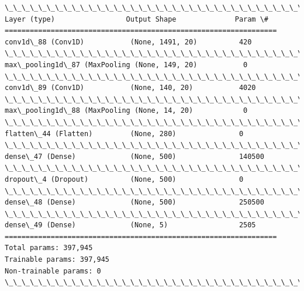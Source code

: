 \documentclass[11pt]{article}
\begin{document}
    \begin{Verbatim}[commandchars=\\\{\}]
\_\_\_\_\_\_\_\_\_\_\_\_\_\_\_\_\_\_\_\_\_\_\_\_\_\_\_\_\_\_\_\_\_\_\_\_\_\_\_\_\_\_\_\_\_\_\_\_\_\_\_\_\_\_\_\_\_\_\_\_\_\_\_\_\_
Layer (type)                 Output Shape              Param \#   
=================================================================
conv1d\_88 (Conv1D)           (None, 1491, 20)          420       
\_\_\_\_\_\_\_\_\_\_\_\_\_\_\_\_\_\_\_\_\_\_\_\_\_\_\_\_\_\_\_\_\_\_\_\_\_\_\_\_\_\_\_\_\_\_\_\_\_\_\_\_\_\_\_\_\_\_\_\_\_\_\_\_\_
max\_pooling1d\_87 (MaxPooling (None, 149, 20)           0         
\_\_\_\_\_\_\_\_\_\_\_\_\_\_\_\_\_\_\_\_\_\_\_\_\_\_\_\_\_\_\_\_\_\_\_\_\_\_\_\_\_\_\_\_\_\_\_\_\_\_\_\_\_\_\_\_\_\_\_\_\_\_\_\_\_
conv1d\_89 (Conv1D)           (None, 140, 20)           4020      
\_\_\_\_\_\_\_\_\_\_\_\_\_\_\_\_\_\_\_\_\_\_\_\_\_\_\_\_\_\_\_\_\_\_\_\_\_\_\_\_\_\_\_\_\_\_\_\_\_\_\_\_\_\_\_\_\_\_\_\_\_\_\_\_\_
max\_pooling1d\_88 (MaxPooling (None, 14, 20)            0         
\_\_\_\_\_\_\_\_\_\_\_\_\_\_\_\_\_\_\_\_\_\_\_\_\_\_\_\_\_\_\_\_\_\_\_\_\_\_\_\_\_\_\_\_\_\_\_\_\_\_\_\_\_\_\_\_\_\_\_\_\_\_\_\_\_
flatten\_44 (Flatten)         (None, 280)               0         
\_\_\_\_\_\_\_\_\_\_\_\_\_\_\_\_\_\_\_\_\_\_\_\_\_\_\_\_\_\_\_\_\_\_\_\_\_\_\_\_\_\_\_\_\_\_\_\_\_\_\_\_\_\_\_\_\_\_\_\_\_\_\_\_\_
dense\_47 (Dense)             (None, 500)               140500    
\_\_\_\_\_\_\_\_\_\_\_\_\_\_\_\_\_\_\_\_\_\_\_\_\_\_\_\_\_\_\_\_\_\_\_\_\_\_\_\_\_\_\_\_\_\_\_\_\_\_\_\_\_\_\_\_\_\_\_\_\_\_\_\_\_
dropout\_4 (Dropout)          (None, 500)               0         
\_\_\_\_\_\_\_\_\_\_\_\_\_\_\_\_\_\_\_\_\_\_\_\_\_\_\_\_\_\_\_\_\_\_\_\_\_\_\_\_\_\_\_\_\_\_\_\_\_\_\_\_\_\_\_\_\_\_\_\_\_\_\_\_\_
dense\_48 (Dense)             (None, 500)               250500    
\_\_\_\_\_\_\_\_\_\_\_\_\_\_\_\_\_\_\_\_\_\_\_\_\_\_\_\_\_\_\_\_\_\_\_\_\_\_\_\_\_\_\_\_\_\_\_\_\_\_\_\_\_\_\_\_\_\_\_\_\_\_\_\_\_
dense\_49 (Dense)             (None, 5)                 2505      
=================================================================
Total params: 397,945
Trainable params: 397,945
Non-trainable params: 0
\_\_\_\_\_\_\_\_\_\_\_\_\_\_\_\_\_\_\_\_\_\_\_\_\_\_\_\_\_\_\_\_\_\_\_\_\_\_\_\_\_\_\_\_\_\_\_\_\_\_\_\_\_\_\_\_\_\_\_\_\_\_\_\_\_

    \end{Verbatim}

    \begin{center}
    \end{center}
    { \hspace*{\fill} \\}
    
\end{document}
